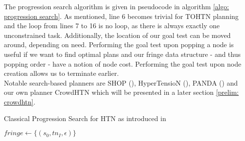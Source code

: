 The progression search algorithm is given in pseudocode in algorithm \ref{algo: progression search}. As mentioned, line 6 becomes trivial for TOHTN planning and the loop from lines 7  to 16 is no loop, as there is always exactly one unconstrained task. Additionally, the location of our goal test can be moved around, depending on need. Performing the goal test upon popping a node is useful if we want to find optimal plans and our fringe data structure - and thus popping order - have a notion of node cost. Performing the goal test upon node creation allows us to terminate earlier. \\
Notable search-based planners are SHOP (\cite{nau1999shop}), HyperTensioN (\cite{magnaguagno2020hypertension}), PANDA (\cite{holler2020htn}) and our own planner CrowdHTN which will be presented in a later section \ref{prelim: crowdhtn}.
\begin{comment}
\cite{holler2020htn}
- progression search is one of the best known search algorithms
- generate plans in a forward way
- always resolve a task that has no more open predecessors with the ordering constraints (is called 'unconstrained task')
- own: for TOHTN: we always have exactly 1 task we want to process next!
- makes it trivial to find the next unconstrained task
- mentioned in the paper
- progression search planners always know the current (world) state, can use this information for heuristics, pruning etc

- other planners search partial plans but not in order, they thus cannot know the current world state
- perform goal test on popping: find optimal plan if popping order is informed by cost
- perform goal test before popping: explore fewer nodes

- Alford et al, 2012, Thm. 3 -> HTN problem is solvable <=> there is a solution in progression space

- parts of the search space will be searched more than once if no additional measures are taken
\end{comment}
\begin{algorithm}
	\caption{Classical Progression Search for HTN as introduced in \cite{holler2020htn}}
	\label{algo: progression search}
	$fringe \gets \{ (s_0, tn_I, \epsilon)\}$\;
\end{algorithm}

